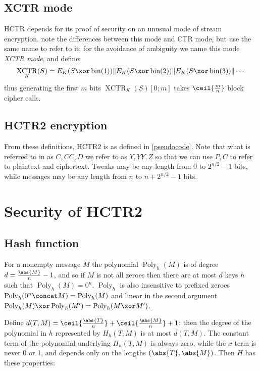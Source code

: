 \documentclass[letterpaper,11pt]{article}
\newcommand*{\Concat}{\Vert}
\DeclareMathOperator{\XCTR}{XCTR}
\DeclareMathOperator{\fromint}{bin}
\DeclareMathOperator{\Poly}{Poly}
\begin{document}
\subsection{XCTR mode}

HCTR depends for its proof of security
on an unusual mode of stream encryption.
\cite{hctr,hctr2} note the differences between this mode and CTR mode,
but use the same name to refer to it; for the avoidance of ambiguity
we name this mode \emph{XCTR mode}, and define:
\begin{displaymath}
    \XCTR_K(S) = E_K(S \xor \fromint(1)) \Concat E_K(S \xor \fromint(2)) \Concat E_K(S \xor \fromint(3)) \Concat \cdots
\end{displaymath}
thus generating the first \(m\) bits \(\XCTR_K(S)[0; m]\) takes \(\ceil{\frac{m}{n}}\) block cipher calls.

\subsection{HCTR2 encryption}

From these definitions, HCTR2 is as defined in \autoref{pseudocode}.
Note that what is referred to in \cite{hctr,hctr2} as \(C, \mathit{CC}, D\)
we refer to as \(Y, YY, Z\)
so that we can use \(P, C\) to refer to plaintext and ciphertext.
Tweaks may be any length from 0 to \(2^{n/2}-1\) bits, while
messages may be any length from \(n\) to \(n + 2^{n/2}-1\) bits.

\section{Security of HCTR2}

\subsection{Hash function}
For a nonempty message \(M\) the polynomial \(\Poly_h(M)\)
is of degree \(d = \frac{\abs{M}}{n} -1\), and so if
\(M\) is not all zeroes then there are at most \(d\)
keys \(h\) such that \(\Poly_h(M) = 0^n\). \(\Poly_h\)
is also insensitive to prefixed zeroes \(\Poly_h(0^n \concat M) = \Poly_h(M)\)
and linear in the second argument \(\Poly_h(M) \xor \Poly_h(M') = \Poly_h(M \xor M')\).

Define \(d(T, M) = \ceil{\frac{\abs{T}}{n}} + \ceil{\frac{\abs{M}}{n}} + 1\);
then the degree of the polynomial in \(h\) represented by \(H_h(T, M)\) is at most \(d(T, M)\).
The constant term of the polynomial underlying \(H_h(T, M)\) is always zero,
while the \(x\) term is never 0 or 1, and depends only on the lengths \((\abs{T}, \abs{M})\).
Then \(H\) has these properties:
\end{document}
